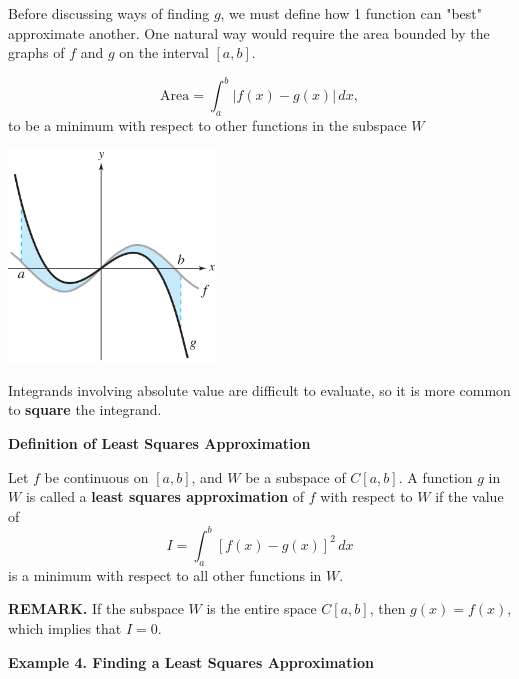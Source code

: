 \documentclass{article}
\begin{document}
    Before discussing ways of finding $g$, we must define how 1 function can "best" approximate another. One natural way would
    require the area bounded by the graphs of $f$ and $g$ on the interval $[a,b]$.

    \begin{minipage}{0.5\linewidth}
    \[\text{Area} = \int_a^b |f(x) - g(x)|\,dx,\]
    to be a minimum with respect to other functions in the subspace $W$
        
    \end{minipage}
    \begin{minipage}{0.45\linewidth}
        \begin{flushright}
            \includegraphics[width = 5.5cm]{images/intfg.png}
        \end{flushright}
    \end{minipage}

    Integrands involving absolute value are difficult to evaluate, so it is more common to \textbf{square} the integrand.
    \begin{tcolorbox}[colback = {blue9}]
        \textbf{Definition of Least Squares Approximation}

        Let $f$ be continuous on $[a,b]$, and $W$ be a subspace of $C[a,b]$. A function $g$ in $W$ is called a \textbf{least squares
        approximation} of $f$ with respect to $W$ if the value of 
        \[I = \int_a^b [f(x) - g(x)]^2\,dx\]
        is a minimum with respect to all other functions in $W$.

    \end{tcolorbox}
    \textbf{REMARK.} If the subspace $W$ is the entire space $C[a,b]$, then $g(x) = f(x)$, which implies that $I = 0$.

    \textbf{Example 4. \textcolor{blue5}{Finding a Least Squares Approximation}}
\end{document}
